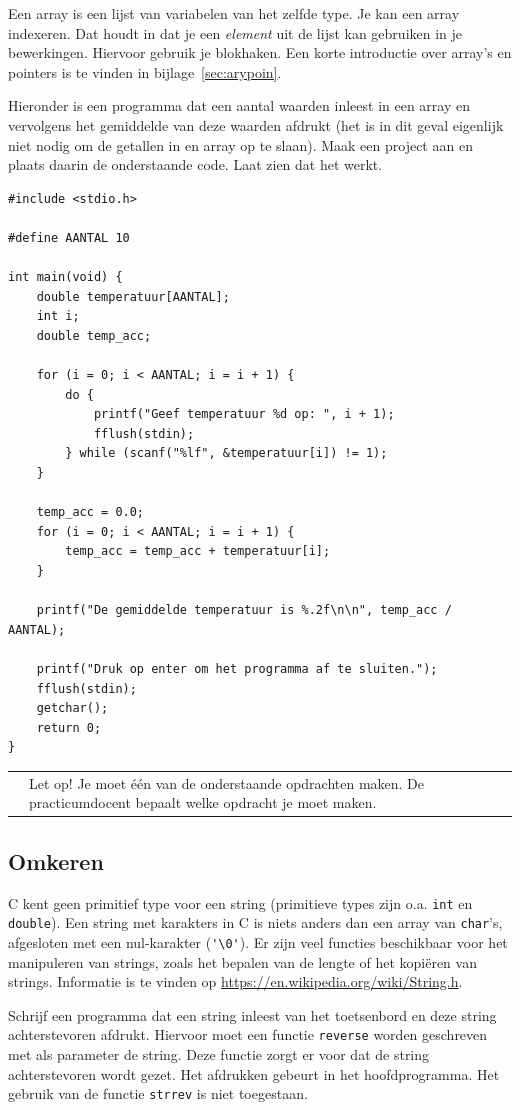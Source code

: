 \documentclass[a4paper,10pt,fleqn,twoside]{article}
\newcommand{\letop}{%
\vspace*{2ex}
\begin{mdframed}[outerlinewidth = 1 ,%
roundcorner = 4 pt,%
leftmargin = 40,%
rightmargin = 40,%
backgroundcolor = yellow!40,%
outerlinecolor = red!70!black,%
innertopmargin = \topskip,%
splittopskip = \topskip,%
]
\begin{tabularx}{\linewidth}{m{1cm}X}
\Large\leftpointright & Let op! Je moet één van de onderstaande opdrachten maken. De practicumdocent bepaalt welke opdracht je moet maken.
\end{tabularx}
\end{mdframed}
}
\begin{document}
Een array is een lijst van variabelen van het zelfde type. Je kan een array indexeren. Dat houdt in dat je een \textsl{element} uit de lijst kan gebruiken in je bewerkingen. Hiervoor gebruik je blokhaken. Een korte introductie over array's en pointers is te vinden in bijlage~\ref{sec:arypoin}.

Hieronder is een programma dat een aantal waarden inleest in een array en vervolgens het gemiddelde van deze waarden afdrukt (het is in dit geval eigenlijk niet nodig om de getallen in en array op te slaan). Maak een project aan en plaats daarin de onderstaande code. Laat zien dat het werkt.


\begin{lstlisting}
#include <stdio.h>

#define AANTAL 10

int main(void) {
    double temperatuur[AANTAL];
    int i;
    double temp_acc;

    for (i = 0; i < AANTAL; i = i + 1) {
        do {
            printf("Geef temperatuur %d op: ", i + 1);
            fflush(stdin);
        } while (scanf("%lf", &temperatuur[i]) != 1);
    }

    temp_acc = 0.0;
    for (i = 0; i < AANTAL; i = i + 1) {
        temp_acc = temp_acc + temperatuur[i];
    }

    printf("De gemiddelde temperatuur is %.2f\n\n", temp_acc / AANTAL);

    printf("Druk op enter om het programma af te sluiten.");
    fflush(stdin);
    getchar();
    return 0;
}
\end{lstlisting}

\letop

\subsection{Omkeren}
C kent geen primitief type voor een string (primitieve types zijn o.a. \lstinline|int| en \lstinline|double|). Een string met karakters in C is niets anders dan een array van \lstinline|char|’s, afgesloten met een nul-karakter (\lstinline|'\0'|). Er zijn veel functies beschikbaar voor het manipuleren van strings, zoals het bepalen van de lengte of het kopiëren van strings. Informatie is te vinden op \url{https://en.wikipedia.org/wiki/String.h}.

Schrijf een programma dat een string inleest van het toetsenbord en deze string achterstevoren afdrukt. Hiervoor moet een functie \lstinline|reverse| worden geschreven met als parameter de string. Deze functie zorgt er voor dat de string achterstevoren wordt gezet. Het afdrukken gebeurt in het hoofdprogramma. Het gebruik van de functie \lstinline|strrev| is niet toegestaan.
\end{document}
